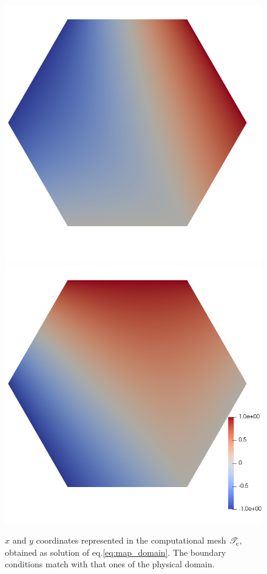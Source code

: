 \documentclass[a4paper,11pt]{article}
\begin{document}
\begin{figure}[h!]
    \centering
    \includegraphics[scale=0.2]{Images/Test1/r-adaptive/xc.png}
    \includegraphics[scale=0.2]{Images/Test1/r-adaptive/yc.png}
    \caption{ $x$ and $y$ coordinates represented in the computational mesh $\mathscr T^{}_{c}$, obtained as solution of eq.\eqref{eq:map_domain}. The boundary conditions match with that ones of the physical domain.}
    \label{fig:x,y_comp}
\end{figure}
 
\end{document}
